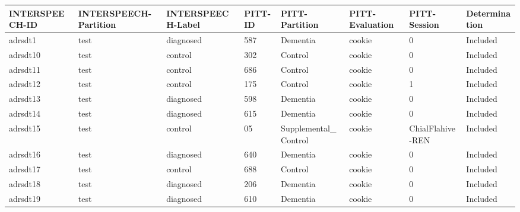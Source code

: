 \begin{center}
\tiny
\begin{longtable}{|l|l|l|l|l|l|l|l|}
\hline
INTERSPEECH-ID & INTERSPEECH-Partition & INTERSPEECH-Label & PITT-ID & PITT-Partition & PITT-Evaluation & PITT-Session & Determination \\ \hline
adrsdt1        & test                  & diagnosed         & 587                & Dementia             & cookie          & 0                & Included      \\ \hline
adrsdt10       & test                  & control           & 302                & Control              & cookie          & 0                & Included      \\ \hline
adrsdt11       & test                  & control           & 686                & Control              & cookie          & 0                & Included      \\ \hline
adrsdt12       & test                  & control           & 175                & Control              & cookie          & 1                & Included      \\ \hline
adrsdt13       & test                  & diagnosed         & 598                & Dementia             & cookie          & 0                & Included      \\ \hline
adrsdt14       & test                  & diagnosed         & 615                & Dementia             & cookie          & 0                & Included      \\ \hline
adrsdt15       & test                  & control           & 05                 & Supplemental\_Control & cookie          & ChialFlahive-REN & Included      \\ \hline
adrsdt16       & test                  & diagnosed         & 640                & Dementia             & cookie          & 0                & Included      \\ \hline
adrsdt17       & test                  & control           & 688                & Control              & cookie          & 0                & Included      \\ \hline
adrsdt18       & test                  & diagnosed         & 206                & Dementia             & cookie          & 0                & Included      \\ \hline
adrsdt19       & test                  & diagnosed         & 610                & Dementia             & cookie          & 0                & Included      \\ \hline

\end{longtable}
\end{center}
